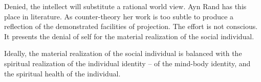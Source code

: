 Denied, the intellect will substitute a rational world view.  Ayn Rand
has this place in literature.  As counter-theory her work is too
subtle to produce a reflection of the demonstrated facilities of
projection.  The effort is not conscious.  It presents the denial of
self for the material realization of the social individual.  

Ideally, the material realization of the social individual is balanced
with the spiritual realization of the individual identity -- of the
mind-body identity, and the spiritual health of the individual.




\vfill
\bye
